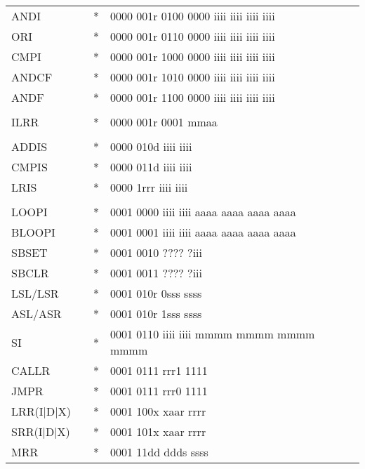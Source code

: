 \documentclass[oneside,english,a4paper,10pt,oneside,openany,final]{memoir}
\begin{document}
\begin{center}
\begin{longtable}{TllT}
ANDI        &          & *  & 0000 001r 0100 0000 iiii iiii iiii iiii \\
ORI         &          & *  & 0000 001r 0110 0000 iiii iiii iiii iiii \\
CMPI        &          & *  & 0000 001r 1000 0000 iiii iiii iiii iiii \\
ANDCF       &          & *  & 0000 001r 1010 0000 iiii iiii iiii iiii \\
ANDF        &          & *  & 0000 001r 1100 0000 iiii iiii iiii iiii \\
            &          &    &                                         \\
ILRR        &          & *  & 0000 001r 0001 mmaa                     \\
            &          &    &                                         \\
ADDIS       &          & *  & 0000 010d iiii iiii                     \\
CMPIS       &          & *  & 0000 011d iiii iiii                     \\
LRIS        &          & *  & 0000 1rrr iiii iiii                     \\
            &          &    &                                         \\
LOOPI       &          & *  & 0001 0000 iiii iiii aaaa aaaa aaaa aaaa \\
BLOOPI      &          & *  & 0001 0001 iiii iiii aaaa aaaa aaaa aaaa \\
SBSET       &          & *  & 0001 0010 ???? ?iii                     \\
SBCLR       &          & *  & 0001 0011 ???? ?iii                     \\
LSL/LSR     &          & *  & 0001 010r 0sss ssss                     \\
ASL/ASR     &          & *  & 0001 010r 1sss ssss                     \\
SI          &          & *  & 0001 0110 iiii iiii mmmm mmmm mmmm mmmm \\
CALLR       &          & *  & 0001 0111 rrr1 1111                     \\
JMPR        &          & *  & 0001 0111 rrr0 1111                     \\
LRR(I|D|X)  &          & *  & 0001 100x xaar rrrr                     \\
SRR(I|D|X)  &          & *  & 0001 101x xaar rrrr                     \\
MRR         &          & *  & 0001 11dd ddds ssss                     \\

\end{longtable}
\end{center}
\end{document}
